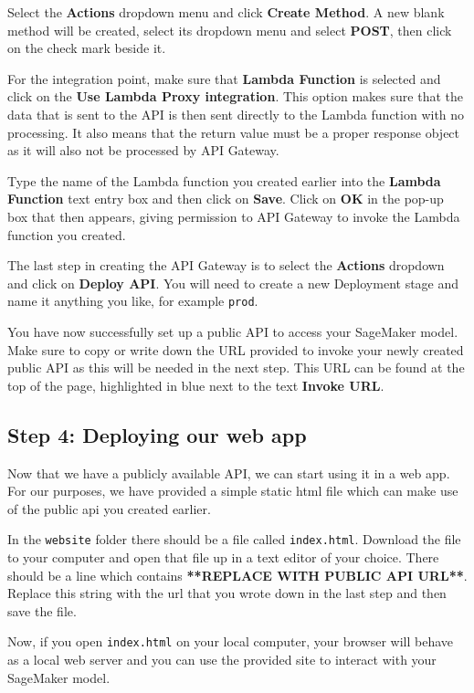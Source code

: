 \documentclass[11pt]{article}
\begin{document}
Select the \textbf{Actions} dropdown menu and click \textbf{Create
Method}. A new blank method will be created, select its dropdown menu
and select \textbf{POST}, then click on the check mark beside it.

For the integration point, make sure that \textbf{Lambda Function} is
selected and click on the \textbf{Use Lambda Proxy integration}. This
option makes sure that the data that is sent to the API is then sent
directly to the Lambda function with no processing. It also means that
the return value must be a proper response object as it will also not be
processed by API Gateway.

Type the name of the Lambda function you created earlier into the
\textbf{Lambda Function} text entry box and then click on \textbf{Save}.
Click on \textbf{OK} in the pop-up box that then appears, giving
permission to API Gateway to invoke the Lambda function you created.

The last step in creating the API Gateway is to select the
\textbf{Actions} dropdown and click on \textbf{Deploy API}. You will
need to create a new Deployment stage and name it anything you like, for
example \texttt{prod}.

You have now successfully set up a public API to access your SageMaker
model. Make sure to copy or write down the URL provided to invoke your
newly created public API as this will be needed in the next step. This
URL can be found at the top of the page, highlighted in blue next to the
text \textbf{Invoke URL}.

    \hypertarget{step-4-deploying-our-web-app}{%
\subsection{Step 4: Deploying our web
app}\label{step-4-deploying-our-web-app}}

Now that we have a publicly available API, we can start using it in a
web app. For our purposes, we have provided a simple static html file
which can make use of the public api you created earlier.

In the \texttt{website} folder there should be a file called
\texttt{index.html}. Download the file to your computer and open that
file up in a text editor of your choice. There should be a line which
contains \textbf{**REPLACE WITH PUBLIC API URL**}. Replace this string
with the url that you wrote down in the last step and then save the
file.

Now, if you open \texttt{index.html} on your local computer, your
browser will behave as a local web server and you can use the provided
site to interact with your SageMaker model.
\end{document}
